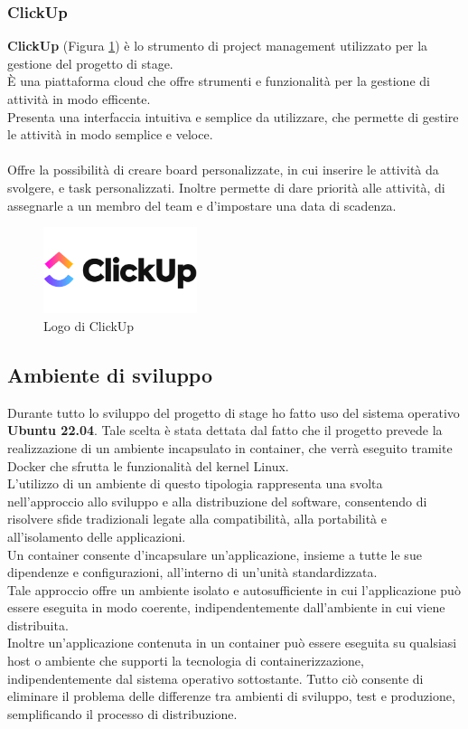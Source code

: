 \subsubsection{ClickUp}   %
\textbf{ClickUp} (Figura \ref{fig:clickup}) è lo strumento di \gls{project management}{} utilizzato per la gestione del progetto di stage.\\ 
È una piattaforma cloud che offre strumenti e funzionalità per la gestione di attività in modo efficente.\\
Presenta una interfaccia intuitiva e semplice da utilizzare, che permette di gestire le attività in modo semplice e veloce.\\
\pagebreak
\\
Offre la possibilità di creare \gls{board}{} personalizzate, in cui inserire le attività da svolgere, e \gls{task}{} personalizzati.
Inoltre permette di dare priorità alle attività, di assegnarle a un membro del team e d'impostare una data di scadenza.\\

\begin{figure}[h]
    \centering
    \includegraphics[width=0.4\textwidth]{images/tecnologie/logo_clickup.png}
    \caption{Logo di ClickUp}
    \label{fig:clickup}
\end{figure}
\subsection{Ambiente di sviluppo}
Durante tutto lo sviluppo del progetto di stage ho fatto uso del sistema operativo \textbf{Ubuntu 22.04}. Tale scelta è stata 
dettata dal fatto che il progetto prevede la realizzazione di un ambiente incapsulato in \gls{container}{}, che verrà eseguito tramite \gls{Docker}{} che 
sfrutta le funzionalità del kernel Linux.\\
L'utilizzo di un ambiente di questo tipologia rappresenta una svolta nell'approccio allo sviluppo e alla distribuzione del software, consentendo di risolvere sfide tradizionali legate alla compatibilità, alla portabilità e all'isolamento delle applicazioni.\\
Un \gls{container}{} consente d'incapsulare un'applicazione, insieme a tutte le sue dipendenze e configurazioni, all'interno di un'unità standardizzata.
\\Tale approccio offre un ambiente isolato e autosufficiente in cui l'applicazione può essere eseguita in modo coerente, indipendentemente dall'ambiente in cui viene distribuita.
\\Inoltre un'applicazione contenuta in un \gls{container}{} può essere eseguita su qualsiasi host o ambiente che supporti la tecnologia di containerizzazione, indipendentemente dal sistema operativo sottostante. 
Tutto ciò consente di eliminare il problema delle differenze tra ambienti di sviluppo, test e produzione, semplificando il processo di distribuzione.
